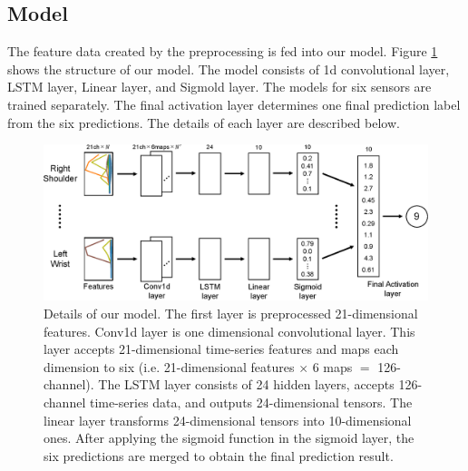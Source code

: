 \documentclass[graybox]{svmult}
\begin{document}
\subsection{Model}
\label{subsec:model}
The feature data created by the preprocessing is fed into our model. Figure \ref{fig:model} shows the structure of our model. The model consists of 1d convolutional layer, LSTM layer, Linear layer, and Sigmold layer. The models for six sensors are trained separately. The final activation layer determines one final prediction label from the six predictions. The details of each layer are described below.

\begin{figure}[ht]
    \centering
    \includegraphics[width=1\linewidth]{figures/model.eps}
    \caption{Details of our model. The first layer is preprocessed 21-dimensional features. Conv1d layer is one dimensional convolutional layer. This layer accepts 21-dimensional time-series features and maps each dimension to six (i.e. 21-dimensional features $\times$ 6 maps $=$ 126-channel). The LSTM layer consists of 24 hidden layers, accepts 126-channel time-series data, and outputs 24-dimensional tensors. The linear layer transforms 24-dimensional tensors into 10-dimensional ones. After applying the sigmoid function in the sigmoid layer, the six predictions are merged to obtain the final prediction result.}
    \label{fig:model}
\end{figure}
\end{document}
